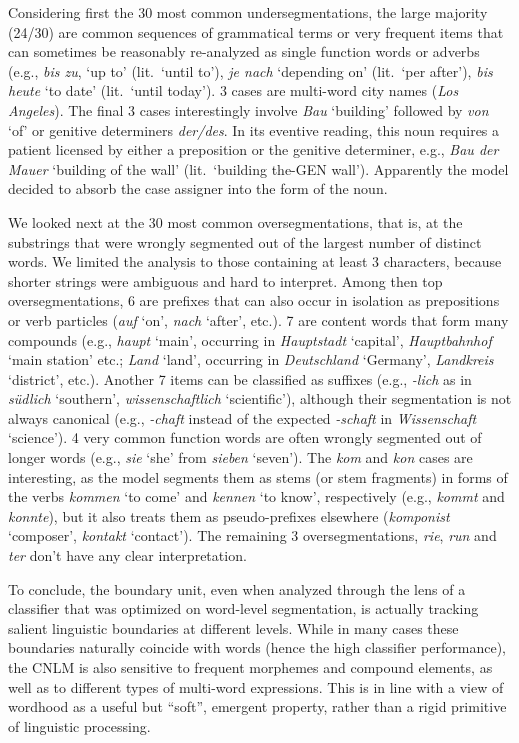 Considering first the 30 most common undersegmentations, the large
majority (24/30) are common sequences of grammatical terms or very
frequent items that can sometimes be reasonably re-analyzed as
single function words or adverbs (e.g., \emph{bis zu}, `up to'
(lit.~`until to'), \emph{je nach} `depending on' (lit.~`per after'),
\emph{bis heute} `to date' (lit.~`until today'). 3 cases are
multi-word city names (\emph{Los Angeles}). The final 3 cases
interestingly involve \emph{Bau} `building' followed by \emph{von}
`of' or genitive determiners \emph{der/des}. In its eventive reading,
this noun requires a patient licensed by either a preposition or the
genitive determiner, e.g., \emph{Bau der Mauer} `building of the wall'
(lit.~`building the-GEN wall'). Apparently the model decided to absorb
the case assigner into the form of the noun.

We looked next at the 30 most common oversegmentations, that is, at the
 substrings that were wrongly segmented out of the largest
number of distinct words. We limited the analysis to those containing
at least 3 characters, because shorter strings were ambiguous and
hard to interpret. Among then top oversegmentations, 6 are prefixes that can also occur in
isolation as prepositions or verb particles (\emph{auf} `on',
\emph{nach} `after', etc.). 7 are content words that form many
compounds (e.g., \emph{haupt} `main', occurring in \emph{Hauptstadt}
`capital', \emph{Hauptbahnhof} `main station' etc.; \emph{Land}
`land', occurring in \emph{Deutschland} `Germany', \emph{Landkreis}
`district', etc.). Another 7 items can be classified as suffixes
(e.g., \emph{-lich} as in \emph{s\"udlich} `southern',
\emph{wissenschaftlich} `scientific'), although their segmentation is
not always canonical (e.g., \emph{-chaft} instead of the expected
\emph{-schaft} in \emph{Wissenschaft} `science'). 4 very common
function words are often wrongly segmented out of longer words (e.g.,
\emph{sie} `she' from \emph{sieben} `seven'). The \emph{kom} and
\emph{kon} cases are interesting, as the model
 segments them as stems (or stem fragments) in forms of the verbs \emph{kommen} `to
come' and \emph{kennen} `to know', respectively (e.g., \emph{kommt}
and \emph{konnte}), but it also treats them as pseudo-prefixes elsewhere
(\emph{komponist} `composer', \emph{kontakt} `contact'). The remaining
3 oversegmentations, \emph{rie}, \emph{run} and \emph{ter} don't have
any clear interpretation.

To conclude, the boundary unit, even when
analyzed through the lens of a classifier that was optimized on
word-level segmentation, is actually tracking salient linguistic
boundaries at different levels. While in many cases these boundaries
naturally coincide with words (hence the high classifier performance),
the CNLM is also sensitive to frequent morphemes and compound
elements, as well as to different types of multi-word
expressions. This is in line with a view of wordhood as a useful but
``soft'', emergent property, rather than a rigid primitive of
linguistic processing.

